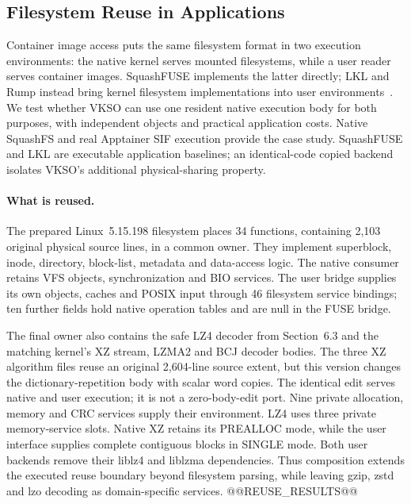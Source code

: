 \subsection{Filesystem Reuse in Applications}
\label{sec:filesystem-reuse}

Container image access puts the same filesystem format in two execution
environments: the native kernel serves mounted filesystems, while a user
reader serves container images. SquashFUSE implements the latter directly;
LKL and Rump instead bring kernel filesystem implementations into user
environments~\cite{ev_squashfuse062,ev_lkl_source,kantee2009rump}.
We test whether VKSO can use one resident native execution body for both
purposes, with independent objects and practical application costs.
Native SquashFS and real Apptainer SIF execution provide the case study.
SquashFUSE and LKL are executable application baselines; an identical-code
copied backend isolates VKSO's additional physical-sharing property.

\paragraph{What is reused.}
The prepared Linux~5.15.198 filesystem places 34 functions, containing
2,103 original physical source lines, in a common owner. They implement
superblock, inode, directory, block-list, metadata and data-access logic.
The native consumer retains VFS objects, synchronization and BIO services.
The user bridge supplies its own objects, caches and POSIX input through
46 filesystem service bindings; ten further fields hold native operation
tables and are null in the FUSE bridge.

The final owner also contains the safe LZ4 decoder from Section~6.3 and the
matching kernel's XZ stream, LZMA2 and BCJ decoder bodies. The three XZ
algorithm files reuse an original 2,604-line source extent, but this version
changes the dictionary-repetition body with scalar word copies. The identical
edit serves native and user execution; it is not a zero-body-edit port.
Nine private allocation, memory and CRC services supply their environment.
LZ4 uses three private memory-service slots. Native XZ retains its PREALLOC
mode, while the user interface supplies complete contiguous blocks in SINGLE
mode. Both user backends remove their liblz4 and liblzma dependencies.
Thus composition extends the executed reuse boundary beyond filesystem
parsing, while leaving gzip, zstd and lzo decoding as domain-specific services.
@@REUSE_RESULTS@@

